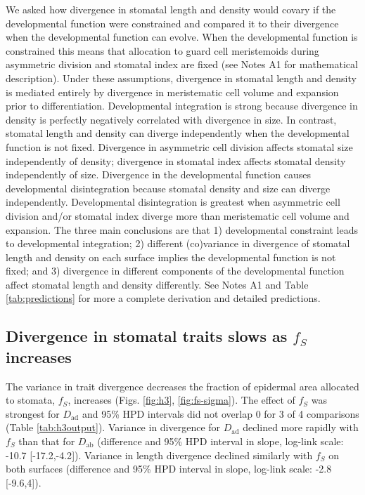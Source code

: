 \documentclass[
  12pt,
]{article}
\begin{document}
We asked how divergence in stomatal length and density would covary if the developmental function were constrained and compared it to their divergence when the developmental function can evolve. When the developmental function is constrained this means that allocation to guard cell meristemoids during asymmetric division and stomatal index are fixed (see Notes A1 for mathematical description). Under these assumptions, divergence in stomatal length and density is mediated entirely by divergence in meristematic cell volume and expansion prior to differentiation. Developmental integration is strong because divergence in density is perfectly negatively correlated with divergence in size. In contrast, stomatal length and density can diverge independently when the developmental function is not fixed. Divergence in asymmetric cell division affects stomatal size independently of density; divergence in stomatal index affects stomatal density independently of size. Divergence in the developmental function causes developmental disintegration because stomatal density and size can diverge independently. Developmental disintegration is greatest when asymmetric cell division and/or stomatal index diverge more than meristematic cell volume and expansion. The three main conclusions are that 1) developmental constraint leads to developmental integration; 2) different (co)variance in divergence of stomatal length and density on each surface implies the developmental function is not fixed; and 3) divergence in different components of the developmental function affect stomatal length and density differently. See Notes A1 and Table \ref{tab:predictions} for more a complete derivation and detailed predictions.

\hypertarget{divergence-in-stomatal-traits-slows-as-f_s-increases}{%
\subsection{\texorpdfstring{Divergence in stomatal traits slows as \(f_S\) increases}{Divergence in stomatal traits slows as f\_S increases}}\label{divergence-in-stomatal-traits-slows-as-f_s-increases}}

The variance in trait divergence decreases the fraction of epidermal area allocated to stomata, \(f_S\), increases (Figs. \ref{fig:h3}, \ref{fig:fs-sigma}). The effect of \(f_S\) was strongest for \(D_\text{ad}\) and 95\% HPD intervals did not overlap 0 for 3 of 4 comparisons (Table \ref{tab:h3output}). Variance in divergence for \(D_\text{ad}\) declined more rapidly with \(f_S\) than that for \(D_\text{ab}\) (difference and 95\% HPD interval in slope, log-link scale: -10.7 {[}-17.2,-4.2{]}). Variance in length divergence declined similarly with \(f_S\) on both surfaces (difference and 95\% HPD interval in slope, log-link scale: -2.8 {[}-9.6,4{]}).
\end{document}
